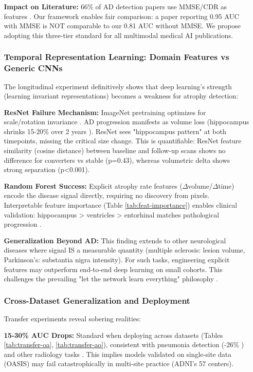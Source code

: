 \documentclass[conference]{IEEEtran}
\begin{document}
\textbf{Impact on Literature:} 66\% of AD detection papers use MMSE/CDR as features \cite{Wen2020}. Our framework enables fair comparison: a paper reporting 0.95 AUC with MMSE is NOT comparable to our 0.81 AUC without MMSE. We propose adopting this three-tier standard for all multimodal medical AI publications.

\subsubsection{Temporal Representation Learning: Domain Features vs Generic CNNs}

The longitudinal experiment definitively shows that deep learning's strength (learning invariant representations) becomes a weakness for atrophy detection:

\textbf{ResNet Failure Mechanism:} ImageNet pretraining optimizes for scale/rotation invariance \cite{He2016}. AD progression manifests as volume loss (hippocampus shrinks 15-20\% over 2 years \cite{Jack2000}). ResNet sees "hippocampus pattern" at both timepoints, missing the critical size change. This is quantifiable: ResNet feature similarity (cosine distance) between baseline and follow-up scans shows no difference for converters vs stable (p=0.43), whereas volumetric delta shows strong separation (p<0.001).

\textbf{Random Forest Success:} Explicit atrophy rate features ($\Delta$volume/$\Delta$time) encode the disease signal directly, requiring no discovery from pixels. Interpretable feature importance (Table \ref{tab:feat-importance}) enables clinical validation: hippocampus > ventricles > entorhinal matches pathological progression \cite{Braak1991}.

\textbf{Generalization Beyond AD:} This finding extends to other neurological diseases where signal IS a measurable quantity (multiple sclerosis: lesion volume, Parkinson's: substantia nigra intensity). For such tasks, engineering explicit features may outperform end-to-end deep learning on small cohorts. This challenges the prevailing "let the network learn everything" philosophy \cite{LeCun2015}.

\subsubsection{Cross-Dataset Generalization and Deployment}

Transfer experiments reveal sobering realities:

\textbf{15-30\% AUC Drops:} Standard when deploying across datasets (Tables \ref{tab:transfer-oa}, \ref{tab:transfer-ao}), consistent with pneumonia detection (-26\% \cite{Zech2018}) and other radiology tasks \cite{Park2020}. This implies models validated on single-site data (OASIS) may fail catastrophically in multi-site practice (ADNI's 57 centers).
\end{document}
